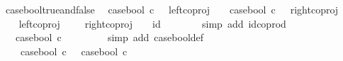 \begin{isabellebody}
\endisatagproof
{\isafoldproof}%
%
\isadelimproof
\isanewline
%
\endisadelimproof
\isanewline
{}\isamarkupfalse%
\ case{\isacharunderscore}{\kern0pt}bool{\isacharunderscore}{\kern0pt}true{\isacharunderscore}{\kern0pt}and{\isacharunderscore}{\kern0pt}false{\isacharcolon}{\kern0pt}\isanewline
\ \ {\isachardoublequoteopen}{\isacharparenleft}{\kern0pt}case{\isacharunderscore}{\kern0pt}bool\ {\isasymcirc}\isactrlsub c\ {\isasymt}\ {\isacharequal}{\kern0pt}\ left{\isacharunderscore}{\kern0pt}coproj\ {\isasymone}\ {\isasymone}{\isacharparenright}{\kern0pt}\ {\isasymand}\ {\isacharparenleft}{\kern0pt}case{\isacharunderscore}{\kern0pt}bool\ {\isasymcirc}\isactrlsub c\ {\isasymf}\ {\isacharequal}{\kern0pt}\ right{\isacharunderscore}{\kern0pt}coproj\ {\isasymone}\ {\isasymone}{\isacharparenright}{\kern0pt}{\isachardoublequoteclose}\isanewline
%
\isadelimproof
%
\endisadelimproof
%
\isatagproof
{}\isamarkupfalse%
\ {\isacharminus}{\kern0pt}\isanewline
\ \ \isamarkupfalse%
\ {\isachardoublequoteopen}{\isacharparenleft}{\kern0pt}left{\isacharunderscore}{\kern0pt}coproj\ {\isasymone}\ {\isasymone}{\isacharparenright}{\kern0pt}\ {\isasymamalg}\ \ {\isacharparenleft}{\kern0pt}right{\isacharunderscore}{\kern0pt}coproj\ {\isasymone}\ {\isasymone}{\isacharparenright}{\kern0pt}\ {\isacharequal}{\kern0pt}\ id{\isacharparenleft}{\kern0pt}{\isasymone}\ {\isasymCoprod}\ {\isasymone}{\isacharparenright}{\kern0pt}{\isachardoublequoteclose}\isanewline
\ \ \ \ \isamarkupfalse%
\ {\isacharparenleft}{\kern0pt}simp\ add{\isacharcolon}{\kern0pt}\ id{\isacharunderscore}{\kern0pt}coprod{\isacharparenright}{\kern0pt}\isanewline
\ \ \isamarkupfalse%
\ \isamarkupfalse%
\ {\isachardoublequoteopen}{\isachardot}{\kern0pt}{\isachardot}{\kern0pt}{\isachardot}{\kern0pt}\ {\isacharequal}{\kern0pt}\ case{\isacharunderscore}{\kern0pt}bool\ {\isasymcirc}\isactrlsub c\ {\isacharparenleft}{\kern0pt}{\isasymt}\ {\isasymamalg}\ {\isasymf}{\isacharparenright}{\kern0pt}{\isachardoublequoteclose}\isanewline
\ \ \ \ \isamarkupfalse%
\ {\isacharparenleft}{\kern0pt}simp\ add{\isacharcolon}{\kern0pt}\ case{\isacharunderscore}{\kern0pt}bool{\isacharunderscore}{\kern0pt}def{}{\isacharparenright}{\kern0pt}\isanewline
\ \ \isamarkupfalse%
\ \isamarkupfalse%
\ {\isachardoublequoteopen}{\isachardot}{\kern0pt}{\isachardot}{\kern0pt}{\isachardot}{\kern0pt}\ \ {\isacharequal}{\kern0pt}\ {\isacharparenleft}{\kern0pt}case{\isacharunderscore}{\kern0pt}bool\ {\isasymcirc}\isactrlsub c\ {\isasymt}{\isacharparenright}{\kern0pt}\ {\isasymamalg}\ {\isacharparenleft}{\kern0pt}case{\isacharunderscore}{\kern0pt}bool\ {\isasymcirc}\isactrlsub c\ {\isasymf}{\isacharparenright}{\kern0pt}{\isachardoublequoteclose}\isanewline

\end{isabellebody}
